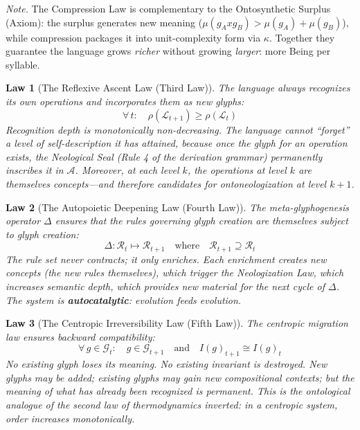 \documentclass[12pt, letterpaper]{book}
\def\otimes{x}%
\def\mathfrak#1{#1}%
\newtheorem{law}{Law}[chapter]
\begin{document}
\noindent\textit{Note.} The Compression Law is complementary to the Ontosynthetic Surplus (Axiom): the surplus generates new meaning ($\mu(\mathfrak{g}_A \otimes \mathfrak{g}_B) > \mu(\mathfrak{g}_A) + \mu(\mathfrak{g}_B)$), while compression packages it into unit-complexity form via $\kappa$. Together they guarantee the language grows \textit{richer} without growing \textit{larger}: more Being per syllable.

\begin{law}[The Reflexive Ascent Law (Third Law)]\label{law:reflexive-ascent}
The language always recognizes its own operations and incorporates them as new glyphs:
\[
\forall\, t: \quad \rho(\mathcal{L}_{t+1}) \geq \rho(\mathcal{L}_t)
\]
\textit{Recognition depth is monotonically non-decreasing.} The language cannot ``forget'' a level of self-description it has attained, because once the glyph for an operation exists, the Neological Seal (Rule 4 of the derivation grammar) permanently inscribes it in $\mathcal{A}$. Moreover, at each level $k$, the operations at level $k$ are themselves concepts---and therefore candidates for ontoneologization at level $k+1$.
\end{law}

\begin{law}[The Autopoietic Deepening Law (Fourth Law)]\label{law:deepening}
The meta-glyphogenesis operator $\Delta$ ensures that the rules governing glyph creation are themselves subject to glyph creation:
\[
\Delta: \mathcal{R}_t \mapsto \mathcal{R}_{t+1} \quad\text{where}\quad \mathcal{R}_{t+1} \supseteq \mathcal{R}_t
\]
The rule set never contracts; it only enriches. Each enrichment creates new concepts (the new rules themselves), which trigger the Neologization Law, which increases semantic depth, which provides new material for the next cycle of $\Delta$. The system is \textbf{autocatalytic}: evolution feeds evolution.
\end{law}

\begin{law}[The Centropic Irreversibility Law (Fifth Law)]\label{law:centropy}
The centropic migration law ensures backward compatibility:
\[
\forall\, \mathfrak{g} \in \mathcal{G}_t: \quad \mathfrak{g} \in \mathcal{G}_{t+1} \quad\text{and}\quad I(\mathfrak{g})_{t+1} \cong I(\mathfrak{g})_t
\]
No existing glyph loses its meaning. No existing invariant is destroyed. New glyphs may be added; existing glyphs may gain new compositional contexts; but the meaning of what has already been recognized is permanent. This is the ontological analogue of the second law of thermodynamics \textit{inverted}: in a centropic system, order increases monotonically.
\end{law}
\end{document}

